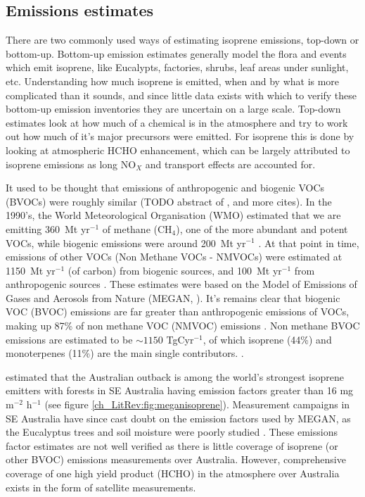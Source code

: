     
  \subsection{Emissions estimates}

    There are two commonly used ways of estimating isoprene emissions, top-down or bottom-up.
    Bottom-up emission estimates generally model the flora and events which emit isoprene, like Eucalypts, factories, shrubs, leaf areas under sunlight, etc.
    Understanding how much isoprene is emitted, when and by what is more complicated than it sounds, and since little data exists with which to verify these bottom-up emission inventories they are uncertain on a large scale.
    Top-down estimates look at how much of a chemical is in the atmosphere and try to work out how much of it's major precursors were emitted.
    For isoprene this is done by looking at atmospheric HCHO enhancement, which can be largely attributed to isoprene emissions as long NO$_X$ and transport effects are accounted for.
    
    It used to be thought that emissions of anthropogenic and biogenic VOCs (BVOCs) were roughly similar (TODO abstract of \citep{Mueller1992}, and more cites).
    In the 1990's, the World Meteorological Organisation (WMO) estimated that we are emitting 360~Mt yr$^{-1}$ of methane (CH$_4$), one of the more abundant and potent VOCs, while biogenic emissions were around 200~Mt yr$^{-1}$ \citep{Atkinson2000}.
    At that point in time, emissions of other VOCs (Non Methane VOCs - NMVOCs) were estimated at 1150~Mt yr$^{-1}$ (of carbon) from biogenic sources, and 100~Mt yr$^{-1}$ from anthropogenic sources \citep{Guenther1995, Atkinson2000}.
    These estimates were based on the Model of Emissions of Gases and Aerosols from Nature (MEGAN, \citet{Guenther1995}).
    It's remains clear that biogenic VOC (BVOC) emissions are far greater than anthropogenic emissions of VOCs, making up 87\% of non methane VOC (NMVOC) emissions \citep{Kanakidou2005, Kefauver2014}.
    Non methane BVOC emissions are estimated to be $\sim1150$ TgCyr$^{-1}$, of which isoprene (44\%) and monoterpenes (11\%) are the main single contributors. \citep{Guenther2000, Kefauver2014}. 
    
    \citet{Guenther2006} estimated that the Australian outback is among the world's strongest isoprene emitters with forests in SE Australia having emission factors greater than 16 mg m$^{-2}$ h$^{-1}$ (see figure \ref{ch_LitRev:fig:meganisoprene}).
    Measurement campaigns in SE Australia have since cast doubt on the emission factors used by MEGAN, as the Eucalyptus trees and soil moisture were poorly studied \cite{Emmerson2016}.
    These emissions factor estimates are not well verified as there is little coverage of isoprene (or other BVOC) emissions measurements over Australia.
    However, comprehensive coverage of one high yield product (HCHO) in the atmosphere over Australia exists in the form of satellite measurements.
    
